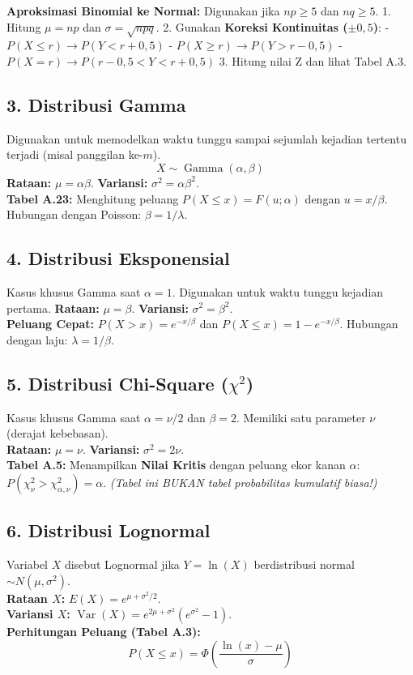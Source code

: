 \documentclass[12pt, a4paper]{article}
\begin{document}
\textbf{Aproksimasi Binomial ke Normal:}
Digunakan jika $np \ge 5$ dan $nq \ge 5$. 
1. Hitung $\mu = np$ dan $\sigma = \sqrt{npq}$.
2. Gunakan \textbf{Koreksi Kontinuitas ($\pm 0{,}5$)}:
   - $P(X \le r) \rightarrow P(Y < r + 0{,}5)$
   - $P(X \ge r) \rightarrow P(Y > r - 0{,}5)$
   - $P(X = r) \rightarrow P(r - 0{,}5 < Y < r + 0{,}5)$
3. Hitung nilai Z dan lihat Tabel A.3.

\subsection{3. Distribusi Gamma}
Digunakan untuk memodelkan waktu tunggu sampai sejumlah kejadian tertentu terjadi (misal panggilan ke-$m$).
$$X \sim \operatorname{Gamma}(\alpha, \beta)$$
\textbf{Rataan:} $\mu = \alpha\beta$. \textbf{Variansi:} $\sigma^2 = \alpha\beta^2$. \\
\textbf{Tabel A.23:} Menghitung peluang $P(X \le x) = F(u; \alpha)$ dengan \textbf{$u = x/\beta$}.
Hubungan dengan Poisson: $\beta = 1/\lambda$.

\subsection{4. Distribusi Eksponensial}
Kasus khusus Gamma saat $\alpha = 1$. Digunakan untuk waktu tunggu kejadian pertama.
\textbf{Rataan:} $\mu = \beta$. \textbf{Variansi:} $\sigma^2 = \beta^2$. \\
\textbf{Peluang Cepat:} $P(X > x) = e^{-x/\beta}$ dan $P(X \le x) = 1 - e^{-x/\beta}$.
Hubungan dengan laju: $\lambda = 1/\beta$.

\subsection{5. Distribusi Chi-Square ($\chi^2$)}
Kasus khusus Gamma saat $\alpha = \nu/2$ dan $\beta = 2$.
Memiliki satu parameter $\nu$ (derajat kebebasan). \\
\textbf{Rataan:} $\mu = \nu$. \textbf{Variansi:} $\sigma^2 = 2\nu$. \\
\textbf{Tabel A.5:} Menampilkan \textbf{Nilai Kritis} dengan peluang ekor kanan $\alpha$: $P(\chi^2_\nu > \chi^2_{\alpha, \nu}) = \alpha$.
\textit{(Tabel ini BUKAN tabel probabilitas kumulatif biasa!)}

\subsection{6. Distribusi Lognormal}
Variabel $X$ disebut Lognormal jika $Y = \ln(X)$ berdistribusi normal $\sim N(\mu, \sigma^2)$. \\
\textbf{Rataan $X$:} $E(X) = e^{\mu + \sigma^2/2}$. \\
\textbf{Variansi $X$:} $\operatorname{Var}(X) = e^{2\mu + \sigma^2}(e^{\sigma^2}-1)$. \\
\textbf{Perhitungan Peluang (Tabel A.3):}
$$P(X \le x) = \Phi\left(\frac{\ln(x) - \mu}{\sigma}\right)$$
\end{document}
